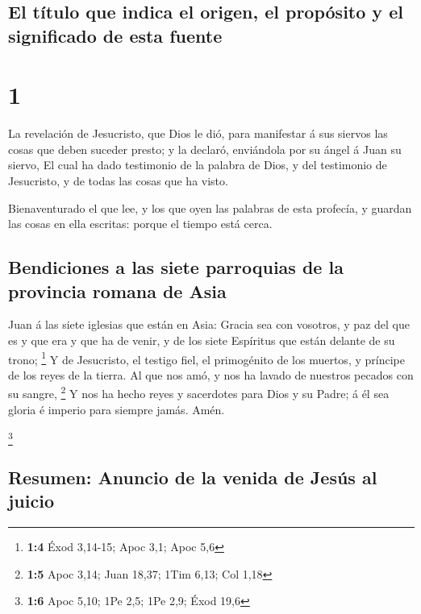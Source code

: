 \hypertarget{el-tuxedtulo-que-indica-el-origen-el-propuxf3sito-y-el-significado-de-esta-fuente}{%
\subsection{El título que indica el origen, el propósito y el
significado de esta
fuente}\label{el-tuxedtulo-que-indica-el-origen-el-propuxf3sito-y-el-significado-de-esta-fuente}}

\hypertarget{section}{%
\section{1}\label{section}}

 La revelación de Jesucristo, que Dios le dió, para
manifestar á sus siervos las cosas que deben suceder presto; y la
declaró, enviándola por su ángel á Juan su siervo,  El
cual ha dado testimonio de la palabra de Dios, y del testimonio de
Jesucristo, y de todas las cosas que ha visto.

 Bienaventurado el que lee, y los que oyen las palabras de
esta profecía, y guardan las cosas en ella escritas: porque el tiempo
está cerca.

\hypertarget{bendiciones-a-las-siete-parroquias-de-la-provincia-romana-de-asia}{%
\subsection{Bendiciones a las siete parroquias de la provincia romana de
Asia}\label{bendiciones-a-las-siete-parroquias-de-la-provincia-romana-de-asia}}

 Juan á las siete iglesias que están en Asia: Gracia sea
con vosotros, y paz del que es y que era y que ha de venir, y de los
siete Espíritus que están delante de su trono; \footnote{\textbf{1:4}
  Éxod 3,14-15; Apoc 3,1; Apoc 5,6}  Y de Jesucristo, el
testigo fiel, el primogénito de los muertos, y príncipe de los reyes de
la tierra. Al que nos amó, y nos ha lavado de nuestros pecados con su
sangre, \footnote{\textbf{1:5} Apoc 3,14; Juan 18,37; 1Tim 6,13; Col
  1,18}  Y nos ha hecho reyes y sacerdotes para Dios y su
Padre; á él sea gloria é imperio para siempre jamás. Amén.

\footnote{\textbf{1:6} Apoc 5,10; 1Pe 2,5; 1Pe 2,9; Éxod 19,6}

\hypertarget{resumen-anuncio-de-la-venida-de-jesuxfas-al-juicio}{%
\subsection{Resumen: Anuncio de la venida de Jesús al
juicio}\label{resumen-anuncio-de-la-venida-de-jesuxfas-al-juicio}}

